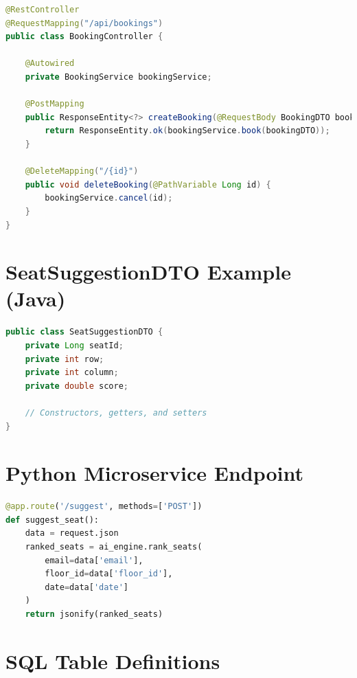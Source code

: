 \documentclass[12pt,a4paper]{report} %
\begin{document}
\begin{lstlisting}[language=Java, caption=Booking Controller (Java), label=lst:booking-controller]
@RestController
@RequestMapping("/api/bookings")
public class BookingController {

    @Autowired
    private BookingService bookingService;

    @PostMapping
    public ResponseEntity<?> createBooking(@RequestBody BookingDTO bookingDTO) {
        return ResponseEntity.ok(bookingService.book(bookingDTO));
    }

    @DeleteMapping("/{id}")
    public void deleteBooking(@PathVariable Long id) {
        bookingService.cancel(id);
    }
}
\end{lstlisting}

\chapter{SeatSuggestionDTO Example (Java)}
\label{appendix:seatdto}

\begin{lstlisting}[language=Java, caption=SeatSuggestionDTO (Java), label=lst:seat-suggestion-dto]
public class SeatSuggestionDTO {
    private Long seatId;
    private int row;
    private int column;
    private double score;

    // Constructors, getters, and setters
}
\end{lstlisting}

\chapter{Python Microservice Endpoint}
\label{appendix:microservice}

\begin{lstlisting}[language=Python, caption=Seat Suggestion Endpoint (Flask), label=lst:python-endpoint]
@app.route('/suggest', methods=['POST'])
def suggest_seat():
    data = request.json
    ranked_seats = ai_engine.rank_seats(
        email=data['email'],
        floor_id=data['floor_id'],
        date=data['date']
    )
    return jsonify(ranked_seats)
\end{lstlisting}

\chapter{SQL Table Definitions}
\label{appendix:sql}
\end{document}

